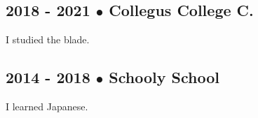 \subsection{2018 - 2021 $\bullet$ Collegus College C.}
I studied the blade.
\subsection{2014 - 2018 $\bullet$ Schooly School}
I learned Japanese.
